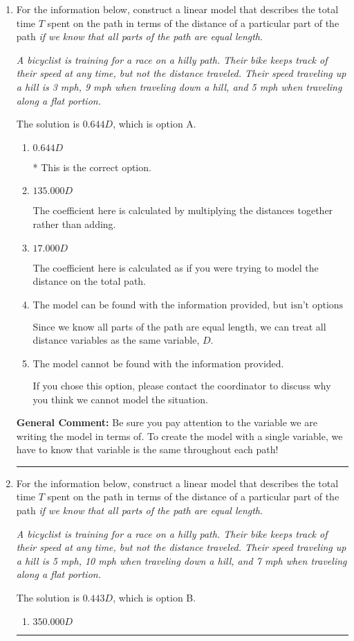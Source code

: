\documentclass{extbook}[14pt]
\newcommand{\litem}[1]{\item #1

\rule{\textwidth}{0.4pt}}
\begin{document}
\begin{enumerate}\litem{
For the information below, construct a linear model that describes the total time $T$ spent on the path in terms of the distance of a particular part of the path \textit{if we know that all parts of the path are equal length}.

\begin{center}
    \textit{ A bicyclist is training for a race on a hilly path. Their bike keeps track of their speed at any time, but not the distance traveled. Their speed traveling up a hill is 3 mph, 9 mph when traveling down a hill, and 5 mph when traveling along a flat portion. }
\end{center}
The solution is \( 0.644 D \), which is option A.\begin{enumerate}[label=\Alph*.]
\item \( 0.644 D \)

* This is the correct option.
\item \( 135.000 D \)

The coefficient here is calculated by multiplying the distances together rather than adding.
\item \( 17.000 D \)

The coefficient here is calculated as if you were trying to model the distance on the total path.
\item \( \text{The model can be found with the information provided, but isn't options 1-3.} \)

Since we know all parts of the path are equal length, we can treat all distance variables as the same variable, $D$.
\item \( \text{The model cannot be found with the information provided.} \)

If you chose this option, please contact the coordinator to discuss why you think we cannot model the situation.
\end{enumerate}

\textbf{General Comment:} Be sure you pay attention to the variable we are writing the model in terms of. To create the model with a single variable, we have to know that variable is the same throughout each path!
}
\litem{
For the information below, construct a linear model that describes the total time $T$ spent on the path in terms of the distance of a particular part of the path \textit{if we know that all parts of the path are equal length}.

\begin{center}
    \textit{ A bicyclist is training for a race on a hilly path. Their bike keeps track of their speed at any time, but not the distance traveled. Their speed traveling up a hill is 5 mph, 10 mph when traveling down a hill, and 7 mph when traveling along a flat portion. }
\end{center}
The solution is \( 0.443 D \), which is option B.\begin{enumerate}[label=\Alph*.]
\item \( 350.000 D \)


\end{enumerate}}
\end{enumerate}
\end{document}
